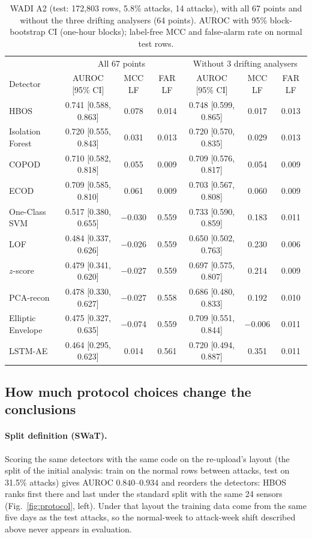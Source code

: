 \documentclass[11pt]{article}
\begin{document}
\begin{table}[t]
\centering\small
\caption{WADI A2 (test: 172{,}803 rows, 5.8\% attacks, 14 attacks), with all 67 points
and without the three drifting analysers (64 points). AUROC with 95\% block-bootstrap CI
(one-hour blocks); label-free MCC and false-alarm rate on normal test rows.}
\label{tab:wadi}
\begin{tabular}{lcccccc}
\toprule
 & \multicolumn{3}{c}{All 67 points} & \multicolumn{3}{c}{Without 3 drifting analysers} \\
Detector & AUROC [95\% CI] & MCC LF & FAR LF & AUROC [95\% CI] & MCC LF & FAR LF \\
\midrule
HBOS & 0.741 [0.588, 0.863] & 0.078 & 0.014 & 0.748 [0.599, 0.865] & 0.017 & 0.013 \\
Isolation Forest & 0.720 [0.555, 0.843] & 0.031 & 0.013 & 0.720 [0.570, 0.835] & 0.029 & 0.013 \\
COPOD & 0.710 [0.582, 0.818] & 0.055 & 0.009 & 0.709 [0.576, 0.817] & 0.054 & 0.009 \\
ECOD & 0.709 [0.585, 0.810] & 0.061 & 0.009 & 0.703 [0.567, 0.808] & 0.060 & 0.009 \\
One-Class SVM & 0.517 [0.380, 0.655] & $-$0.030 & 0.559 & 0.733 [0.590, 0.859] & 0.183 & 0.011 \\
LOF & 0.484 [0.337, 0.626] & $-$0.026 & 0.559 & 0.650 [0.502, 0.763] & 0.230 & 0.006 \\
$z$-score & 0.479 [0.341, 0.620] & $-$0.027 & 0.559 & 0.697 [0.575, 0.807] & 0.214 & 0.009 \\
PCA-recon & 0.478 [0.330, 0.627] & $-$0.027 & 0.558 & 0.686 [0.480, 0.833] & 0.192 & 0.010 \\
Elliptic Envelope & 0.475 [0.327, 0.635] & $-$0.074 & 0.559 & 0.709 [0.551, 0.844] & $-$0.006 & 0.011 \\
LSTM-AE & 0.464 [0.295, 0.623] & 0.014 & 0.561 & 0.720 [0.494, 0.887] & 0.351 & 0.011 \\
\bottomrule
\end{tabular}
\end{table}

\subsection{How much protocol choices change the conclusions}
\label{sec:protocol}

\paragraph{Split definition (SWaT).} Scoring the same detectors with the same
code on the re-upload's layout (the split of the initial analysis: train on the
normal rows between attacks, test on 31.5\% attacks) gives AUROC $0.840$--$0.934$
and reorders the detectors: HBOS ranks first there and last under the standard
split with the same 24 sensors (Fig.~\ref{fig:protocol}, left). Under that layout the training data come
from the same five days as the test attacks, so the normal-week to attack-week
shift described above never appears in evaluation.
\end{document}
